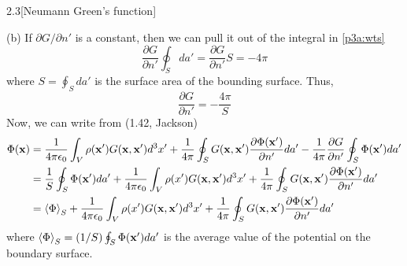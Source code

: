 \documentclass[12pt]{article}
\begin{document}
\begin{problem}{2.3}[Neumann Green's function]
\begin{solution}
    (b) If $\partial G/\partial n'$ is a constant, then we can pull it out of
    the integral in \eqref{p3a:wts}
    \begin{equation}
        \frac{\partial G}{\partial n'}\oint_Sda'=\frac{\partial G}{\partial
        n'}S=-4\pi 
    \end{equation}
    where $S=\oint_Sda'$ is the surface area of the bounding surface. Thus,
    \begin{equation}
        \frac{\partial G}{\partial n'}=-\frac{4\pi}{S} 
    \end{equation}
    Now, we can write from (1.42, Jackson)
    \begin{align}
        \Phi(\vb{x})&=\frac1{4\pi\epsilon_0}\int_V\rho(\vb{x}')G(\vb{x},\vb{x}')d^3x'
        +\frac1{4\pi}\oint_SG(\vb{x},\vb{x}')\frac{\partial\Phi(\vb{x}')}{\partial
        n'}da'
        -\frac1{4\pi}\frac{\partial G}{\partial
        n'}\oint_S\Phi(\vb{x}')da'\notag\\
        &=\frac1S\oint_S\Phi(\vb{x}')da'+\frac1{4\pi\epsilon_0}\int_V\rho(x')G(\vb{x},\vb{x}')d^3x'
        +\frac1{4\pi}\oint_SG(\vb{x},\vb{x}')\frac{\partial\Phi(\vb{x}')}{\partial
        n'}da'\notag\\
        &=\expval{\Phi}_S+\frac1{4\pi\epsilon_0}\int_V\rho(x')G(\vb{x},\vb{x}')d^3x'
        +\frac1{4\pi}\oint_SG(\vb{x},\vb{x}')\frac{\partial\Phi(\vb{x}')}{\partial
        n'}da'
    \end{align}
    where $\expval{\Phi}_S=(1/S)\oint_S\Phi(\vb{x}')da'$ is the average value of
    the potential on the boundary surface.
\end{solution}

\end{problem}

\end{document}

